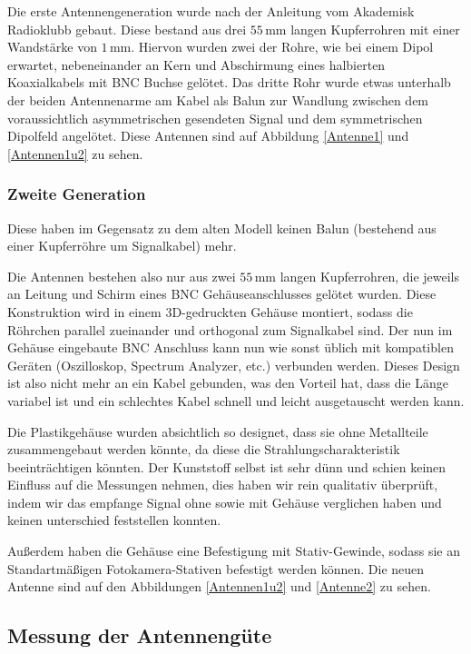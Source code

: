\documentclass[titlepage,11pt,a4paper,ngerman]{article}
\begin{document}
Die erste Antennengeneration wurde nach der Anleitung \cite{Antennenbauanleitung} vom Akademisk Radioklubb gebaut. Diese bestand aus drei $55\,$mm langen Kupferrohren mit einer Wandstärke von $1\,$mm. Hiervon wurden zwei der Rohre, wie bei einem Dipol erwartet, nebeneinander an Kern und Abschirmung eines halbierten Koaxialkabels mit BNC Buchse gelötet. Das dritte Rohr wurde etwas unterhalb der beiden Antennenarme am Kabel als Balun zur Wandlung zwischen dem voraussichtlich asymmetrischen gesendeten Signal und dem symmetrischen Dipolfeld angelötet. Diese Antennen sind auf Abbildung \ref{Antenne1} und \ref{Antennen1u2} zu sehen.

\subsubsection{Zweite Generation}

 Diese haben im Gegensatz zu dem alten Modell keinen Balun (bestehend aus einer Kupferröhre um Signalkabel) mehr.\par
Die Antennen bestehen also nur aus zwei $55\,$mm langen Kupferrohren, die jeweils an Leitung und Schirm eines BNC Gehäuseanschlusses gelötet wurden. Diese Konstruktion wird in einem 3D-gedruckten Gehäuse montiert, sodass die Röhrchen parallel zueinander und orthogonal zum Signalkabel sind. Der nun im Gehäuse eingebaute BNC Anschluss kann nun wie sonst üblich mit kompatiblen Geräten (Oszilloskop, Spectrum Analyzer, etc.) verbunden werden. Dieses Design ist also nicht mehr an ein Kabel gebunden, was den Vorteil hat, dass die Länge variabel ist und ein schlechtes Kabel schnell und leicht ausgetauscht werden kann.\par
Die Plastikgehäuse wurden absichtlich so designet, dass sie ohne Metallteile zusammengebaut werden könnte, da diese die Strahlungscharakteristik beeinträchtigen könnten. Der Kunststoff selbst ist sehr dünn und schien keinen Einfluss auf die Messungen nehmen, dies haben wir rein qualitativ überprüft, indem wir das empfange Signal ohne sowie mit Gehäuse verglichen haben und keinen unterschied feststellen konnten.\par
Außerdem haben die Gehäuse eine Befestigung mit Stativ-Gewinde, sodass sie an Standartmäßigen Fotokamera-Stativen befestigt werden können. Die neuen Antenne sind auf den Abbildungen \ref{Antennen1u2} und \ref{Antenne2} zu sehen.

\subsection{Messung der Antennengüte}
\end{document}
